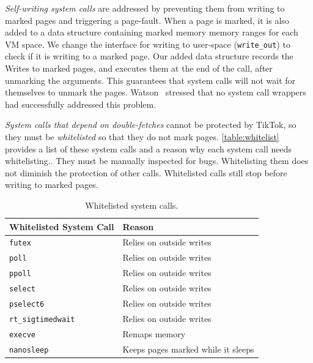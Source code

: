 \documentclass[conference]{IEEEtran}
\newcommand{\sysname}{TikTok}
\begin{document}
\emph{Self-writing system calls} are addressed by preventing them from writing
to marked pages and triggering a page-fault. When a page is marked, it is also
added to a data structure containing marked memory memory ranges for each VM
space. We change the interface for writing to user-space (\texttt{write\_out})
to check if it is writing to a marked page. Our added data structure records the
Writes to marked pages, and executes them at the end of the call, after
unmarking the arguments. This guarantees that system calls will not wait for
themselves to unmark the pages.  Watson~\cite{watson2007exploiting} stressed
that no system call wrappers had successfully addressed this problem.

\emph{System calls that depend on double-fetches} cannot be protected by
\sysname{}, so they must be \emph{whitelisted} so that they do not mark
pages. \autoref{table:whitelist} provides a list of these system calls and a
reason why each system call needs whitelisting.. They
must be manually inspected for bugs. Whitelisting them does not diminish the protection
of other calls. Whitelisted calls still stop before writing to marked pages.

\begin{table}[]
  \begin{tabular}{|l|l|}
  \hline
  Whitelisted System Call & Reason                                 \\ \hline
  \texttt{futex}                   & Relies on outside writes               \\ \hline
  \texttt{poll}                    & Relies on outside writes               \\ \hline
  \texttt{ppoll}                   & Relies on outside writes               \\ \hline
  \texttt{select}                  & Relies on outside writes               \\ \hline
  \texttt{pselect6}                & Relies on outside writes               \\ \hline
  \texttt{rt\_sigtimedwait}        & Relies on outside writes               \\ \hline
  \texttt{execve}                  & Remaps memory                          \\ \hline
  \texttt{nanosleep}               & Keeps pages marked while it sleeps \\ \hline
  \end{tabular}
  \caption{Whitelisted system calls.}
  \label{table:whitelist}
  \end{table}
\end{document}
